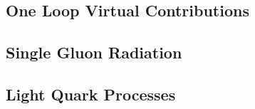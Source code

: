 \subsection{One Loop Virtual Contributions}


\subsection{Single Gluon Radiation} \label{sec:NLO:g}


\subsection{Light Quark Processes}

